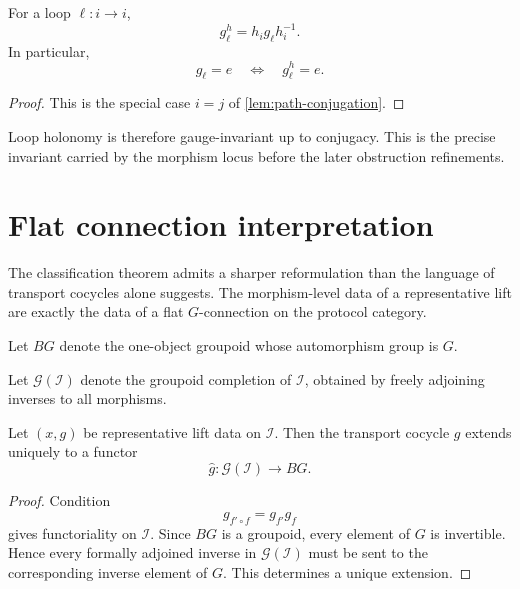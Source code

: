 \begin{corollary}
	For a loop \(\ell:i\to i\),
	\[
		g_\ell^h=h_i g_\ell h_i^{-1}.
	\]
	In particular,
	\[
		g_\ell=e
		\quad\Longleftrightarrow\quad
		g_\ell^h=e.
	\]
\end{corollary}
\begin{proof}
	This is the special case \(i=j\) of
	\cref{lem:path-conjugation}.
\end{proof}
\begin{remark}
	Loop holonomy is therefore gauge-invariant up to conjugacy.
	This is the precise invariant carried by the morphism locus before the
	later obstruction refinements.
\end{remark}
\section{Flat connection interpretation}
\label{sec:lift-bundle}
The classification theorem admits a sharper reformulation than the
language of transport cocycles alone suggests.
The morphism-level data of a representative lift are exactly the data
of a flat \(G\)-connection on the protocol category.
\begin{definition}
	Let \(BG\) denote the one-object groupoid whose automorphism group is
	\(G\).
\end{definition}
\begin{definition}
	\label{def:groupoid-completion}
	Let \(\mathcal G(\mathcal I)\) denote the groupoid completion of
	\(\mathcal I\), obtained by freely adjoining inverses to all morphisms.
\end{definition}
\begin{lemma}
	\label{lem:cocycle-extension}
	Let \((x,g)\) be representative lift data on \(\mathcal I\).
	Then the transport cocycle \(g\) extends uniquely to a functor
	\[
		\widehat g:\mathcal G(\mathcal I)\to BG.
	\]
\end{lemma}
\begin{proof}
	Condition
	\[
		g_{f'\circ f}=g_{f'}g_f
	\]
	gives functoriality on \(\mathcal I\).
	Since \(BG\) is a groupoid, every element of \(G\) is invertible.
	Hence every formally adjoined inverse in \(\mathcal G(\mathcal I)\)
	must be sent to the corresponding inverse element of \(G\).
	This determines a unique extension.
\end{proof}
